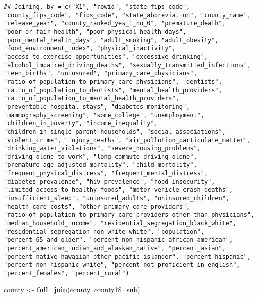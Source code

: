 \documentclass[
]{article}
\newenvironment{Shaded}{\begin{snugshade}}{\end{snugshade}}
\newcommand{\KeywordTok}[1]{\textcolor[rgb]{0.13,0.29,0.53}{\textbf{#1}}}
\newcommand{\NormalTok}[1]{#1}
\newcommand{\StringTok}[1]{\textcolor[rgb]{0.31,0.60,0.02}{#1}}
\begin{document}
\begin{verbatim}
## Joining, by = c("X1", "rowid", "state_fips_code", "county_fips_code", "fips_code", "state_abbreviation", "county_name", "release_year", "county_ranked_yes_1_no_0", "premature_death", "poor_or_fair_health", "poor_physical_health_days", "poor_mental_health_days", "adult_smoking", "adult_obesity", "food_environment_index", "physical_inactivity", "access_to_exercise_opportunities", "excessive_drinking", "alcohol_impaired_driving_deaths", "sexually_transmitted_infections", "teen_births", "uninsured", "primary_care_physicians", "ratio_of_population_to_primary_care_physicians", "dentists", "ratio_of_population_to_dentists", "mental_health_providers", "ratio_of_population_to_mental_health_providers", "preventable_hospital_stays", "diabetes_monitoring", "mammography_screening", "some_college", "unemployment", "children_in_poverty", "income_inequality", "children_in_single_parent_households", "social_associations", "violent_crime", "injury_deaths", "air_pollution_particulate_matter", "drinking_water_violations", "severe_housing_problems", "driving_alone_to_work", "long_commute_driving_alone", "premature_age_adjusted_mortality", "child_mortality", "frequent_physical_distress", "frequent_mental_distress", "diabetes_prevalence", "hiv_prevalence", "food_insecurity", "limited_access_to_healthy_foods", "motor_vehicle_crash_deaths", "insufficient_sleep", "uninsured_adults", "uninsured_children", "health_care_costs", "other_primary_care_providers", "ratio_of_population_to_primary_care_providers_other_than_physicians", "median_household_income", "residential_segregation_black_white", "residential_segregation_non_white_white", "population", "percent_65_and_older", "percent_non_hispanic_african_american", "percent_american_indian_and_alaskan_native", "percent_asian", "percent_native_hawaiian_other_pacific_islander", "percent_hispanic", "percent_non_hispanic_white", "percent_not_proficient_in_english", "percent_females", "percent_rural")
\end{verbatim}

\begin{Shaded}
\begin{Highlighting}[]
\NormalTok{county <-}\StringTok{ }\KeywordTok{full_join}\NormalTok{(county, county18_sub)}
\end{Highlighting}
\end{Shaded}
\end{document}
